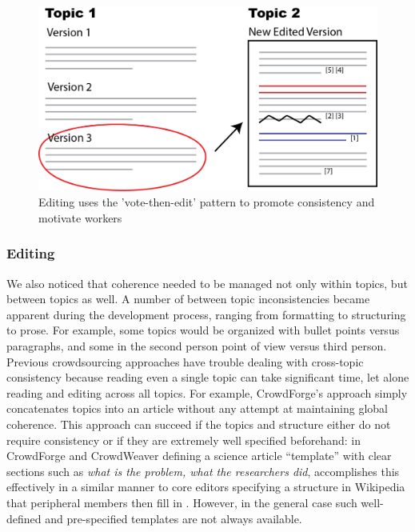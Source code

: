 
\begin{figure}[!ht]
    \centering
    \includegraphics[width=0.6\columnwidth]{Chapters/KA/edit}
    \caption[The 'vote-then-edit' pattern promotes consistency and motivates workers.]{Editing uses the 'vote-then-edit' pattern to promote consistency and motivate workers}
    \label{fig:editing}
\end{figure}

\subsubsection{Editing}

We also noticed that coherence needed to be managed not only within topics, but between topics as well. A number of between topic inconsistencies became apparent during the development process, ranging from formatting to structuring to prose. For example, some topics would be organized with bullet points versus paragraphs, and some in the second person point of view versus third person. Previous crowdsourcing approaches have trouble dealing with cross-topic consistency because reading even a single topic can take significant time, let alone reading and editing across all topics. For example, CrowdForge's \cite{kittur2011crowdforge} approach simply concatenates topics into an article without any attempt at maintaining global coherence. This approach can succeed if the topics and structure either do not require consistency or if they are extremely well specified beforehand: in CrowdForge and CrowdWeaver defining a science article “template” with clear sections such as \textit{what is the problem, what the researchers did}, accomplishes this effectively in a similar manner to core editors specifying a structure in Wikipedia that peripheral members then fill in \cite{kittur2008harnessing}. However, in the general case such well-defined and pre-specified templates are not always available.

